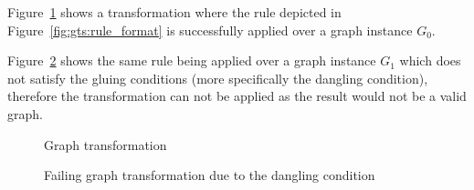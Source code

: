 \begin{example} Figure~\ref{fig:gts:transformation} shows a transformation where the rule depicted in Figure~\ref{fig:gts:rule_format} is successfully applied over a graph instance $G_0$.

  Figure~\ref{fig:gts:transformation-failed} shows the same rule being applied over a graph instance $G_1$ which does not satisfy the gluing conditions (more specifically the dangling condition), therefore the transformation can not be applied as the result would not be a valid graph.

\begin{figure}[!ht]
  \centering
  \caption{Graph transformation}\label{fig:gts:transformation}
\end{figure}

\begin{figure}[!ht]
  \centering
  \caption{Failing graph transformation due to the dangling condition}\label{fig:gts:transformation-failed}
\end{figure}

\end{example}

